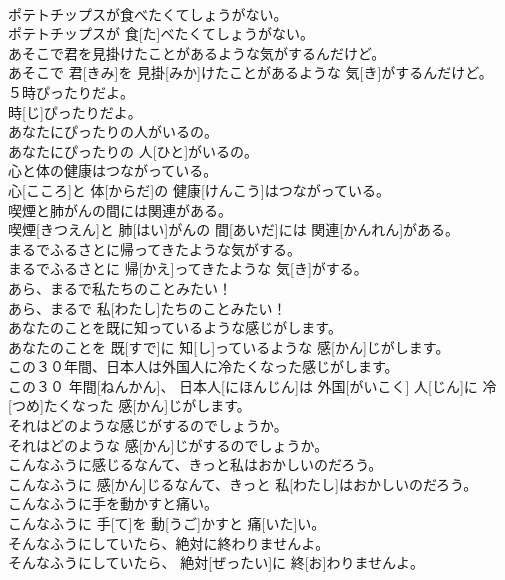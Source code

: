 \documentclass[8pt]{extreport}
\begin{document}
\begin{CJK}{UTF8}{min}
\\	ポテトチップスが食べたくてしょうがない。	
\\	ポテトチップスが 食[た]べたくてしょうがない。	
\\	あそこで君を見掛けたことがあるような気がするんだけど。	
\\	あそこで 君[きみ]を 見掛[みか]けたことがあるような 気[き]がするんだけど。	
\\	５時ぴったりだよ。	
\\	時[じ]ぴったりだよ。	
\\	あなたにぴったりの人がいるの。	
\\	あなたにぴったりの 人[ひと]がいるの。	
\\	心と体の健康はつながっている。	
\\	心[こころ]と 体[からだ]の 健康[けんこう]はつながっている。	
\\	喫煙と肺がんの間には関連がある。	
\\	喫煙[きつえん]と 肺[はい]がんの 間[あいだ]には 関連[かんれん]がある。	
\\	まるでふるさとに帰ってきたような気がする。	
\\	まるでふるさとに 帰[かえ]ってきたような 気[き]がする。	
\\	あら、まるで私たちのことみたい！	
\\	あら、まるで 私[わたし]たちのことみたい！	
\\	あなたのことを既に知っているような感じがします。	
\\	あなたのことを 既[すで]に 知[し]っているような 感[かん]じがします。	
\\	この３０年間、日本人は外国人に冷たくなった感じがします。	
\\	この３０ 年間[ねんかん]、 日本人[にほんじん]は 外国[がいこく] 人[じん]に 冷[つめ]たくなった 感[かん]じがします。	
\\	それはどのような感じがするのでしょうか。	
\\	それはどのような 感[かん]じがするのでしょうか。	
\\	こんなふうに感じるなんて、きっと私はおかしいのだろう。	
\\	こんなふうに 感[かん]じるなんて、きっと 私[わたし]はおかしいのだろう。	
\\	こんなふうに手を動かすと痛い。	
\\	こんなふうに 手[て]を 動[うご]かすと 痛[いた]い。	
\\	そんなふうにしていたら、絶対に終わりませんよ。	
\\	そんなふうにしていたら、 絶対[ぜったい]に 終[お]わりませんよ。	

\end{CJK}
\end{document}
